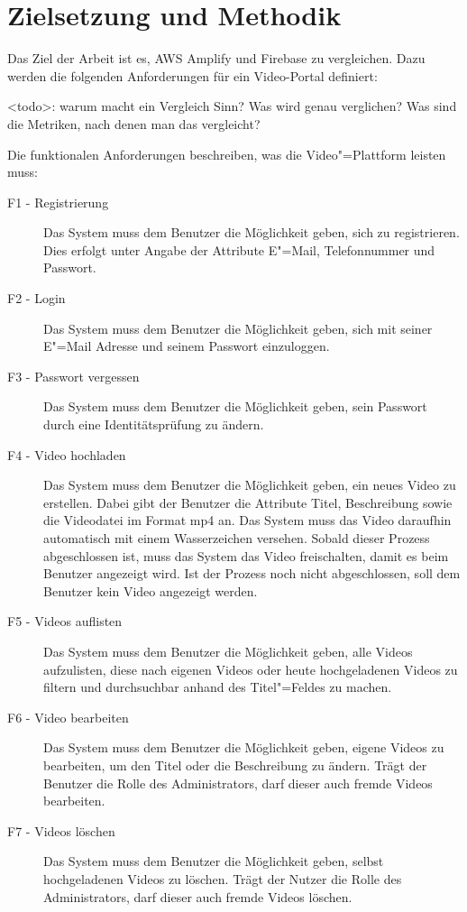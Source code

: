 \section{Zielsetzung und Methodik}

Das Ziel der Arbeit ist es, AWS Amplify und Firebase zu vergleichen. Dazu werden die folgenden Anforderungen für ein Video-Portal definiert:

<todo>: warum macht ein Vergleich Sinn? Was wird genau verglichen? Was sind die Metriken, nach denen man das vergleicht?

Die funktionalen Anforderungen beschreiben, was die Video"=Plattform leisten muss:
\begin{description}
   \item[F1 - Registrierung] Das System muss dem Benutzer die Möglichkeit geben, sich zu registrieren. Dies erfolgt unter Angabe der Attribute E"=Mail, Telefonnummer und Passwort. \label{F1}
   \item[F2 - Login] Das System muss dem Benutzer die Möglichkeit geben, sich mit seiner E"=Mail Adresse und seinem Passwort einzuloggen. \label{F2}
   \item[F3 - Passwort vergessen] Das System muss dem Benutzer die Möglichkeit geben, sein Passwort durch eine Identitätsprüfung zu ändern. \label{F3}
   \item[F4 - Video hochladen] Das System muss dem Benutzer die Möglichkeit geben, ein neues Video zu erstellen. Dabei gibt der Benutzer die Attribute Titel, Beschreibung sowie die Videodatei im Format mp4 an. Das System muss das Video daraufhin automatisch mit einem Wasserzeichen versehen. Sobald dieser Prozess abgeschlossen ist, muss das System das Video freischalten, damit es beim Benutzer angezeigt wird. Ist der Prozess noch nicht abgeschlossen, soll dem Benutzer kein Video angezeigt werden. \label{F4}
   \item[F5 - Videos auflisten] Das System muss dem Benutzer die Möglichkeit geben, alle Videos aufzulisten, diese nach eigenen Videos oder heute hochgeladenen Videos zu filtern und durchsuchbar anhand des Titel"=Feldes zu machen. \label{F5}
   \item[F6 - Video bearbeiten] Das System muss dem Benutzer die Möglichkeit geben, eigene Videos zu bearbeiten, um den Titel oder die Beschreibung zu ändern. Trägt der Benutzer die Rolle des Administrators, darf dieser auch fremde Videos bearbeiten. \label{F6}
   \item[F7 - Videos löschen] Das System muss dem Benutzer die Möglichkeit geben, selbst hochgeladenen Videos zu löschen. Trägt der Nutzer die Rolle des Administrators, darf dieser auch fremde Videos löschen. \label{F7}
\end{description}

